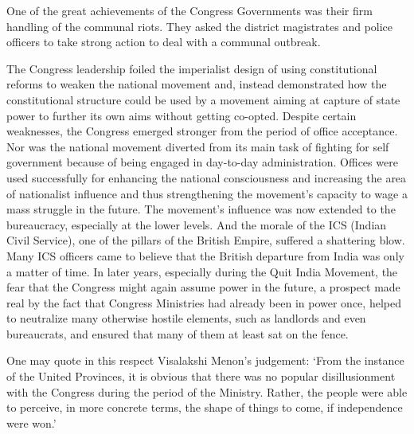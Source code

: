 One of the great achievements of the Congress Governments was their firm handling of the communal riots. They asked the district magistrates and police officers to take strong action to deal with a communal outbreak. 

The Congress leadership foiled the imperialist design of using constitutional reforms to weaken the national movement and, instead demonstrated how the constitutional structure could be used by a movement aiming at capture of state power to further its own aims without getting co-opted. Despite certain weaknesses, the Congress emerged stronger from the period of office acceptance. Nor was the national movement diverted from its main task of fighting for self government because of being engaged in day-to-day administration. Offices were used successfully for enhancing the national consciousness and increasing the area of nationalist influence and thus strengthening the movement's capacity to wage a mass struggle in the future. The movement's influence was now extended to the bureaucracy, especially at the lower levels. And the morale of the ICS (Indian Civil Service), one of the pillars of the British Empire, suffered a shattering blow. Many ICS officers came to believe that the British departure from India was only a matter of time. In later years, especially during the Quit India Movement, the fear that the Congress might again assume power in the future, a prospect made real by the fact that Congress Ministries had already been in power once, helped to neutralize many otherwise hostile elements, such as landlords and even bureaucrats, and ensured that many of them at least sat on the fence. 

One may quote in this respect Visalakshi Menon's judgement: `From the instance of the United Provinces, it is obvious that there was no popular disillusionment with the Congress during the period of the Ministry. Rather, the people were able to perceive, in more concrete terms, the shape of things to come, if independence were won.' 

